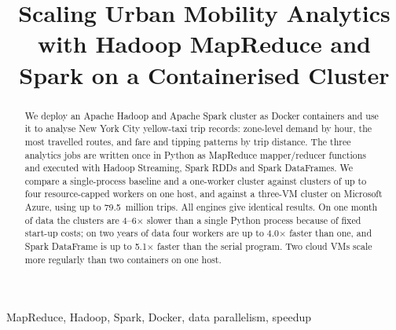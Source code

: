 \documentclass[conference,a4paper]{IEEEtran}
\begin{document}
\title{Scaling Urban Mobility Analytics with Hadoop MapReduce and Spark on a Containerised Cluster}

\ifdefined\withids

\else
\author{
}
\fi

\maketitle
\thispagestyle{plain}\pagestyle{plain}   %
\raggedbottom   %

\begin{abstract}
We deploy an Apache Hadoop and Apache Spark cluster as Docker containers and use it
to analyse New York City yellow-taxi trip records: zone-level demand by hour, the most
travelled routes, and fare and tipping patterns by trip distance. The three analytics
jobs are written once in Python as MapReduce mapper/reducer functions and executed with
Hadoop Streaming, Spark RDDs and Spark DataFrames. We compare a single-process baseline
and a one-worker cluster against clusters of up to four resource-capped workers on
one host, and against a three-VM cluster on Microsoft Azure, using up to 79.5~million
trips. All engines give identical results. On one month of data the clusters are
4--6$\times$ slower than a single Python process because of fixed start-up costs; on two
years of data four workers are up to 4.0$\times$ faster than one, and Spark DataFrame is
up to 5.1$\times$ faster than the serial program. Two cloud VMs scale more regularly
than two containers on one host.
\end{abstract}

\begin{IEEEkeywords}
MapReduce, Hadoop, Spark, Docker, data parallelism, speedup
\end{IEEEkeywords}













\appendices

\end{document}
